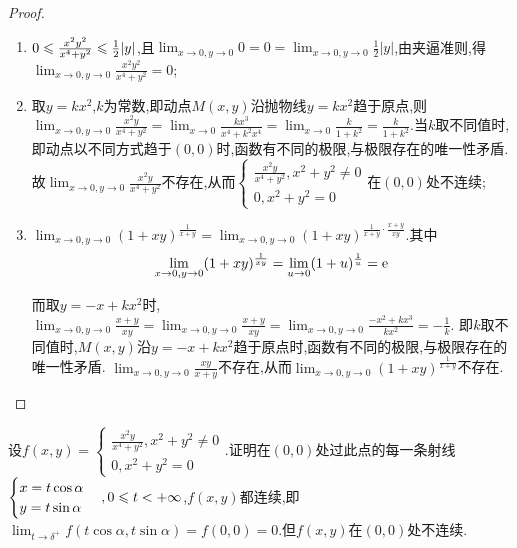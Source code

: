 \begin{proof}
    \begin{enumerate}
        \item $0 \leqslant \frac{x^2 y^2}{x^4 + y^2} \leqslant \frac12 |y|$,且$\lim_{x \to 0, y \to 0} 0 = 0 = \lim_{x \to 0, y \to 0} \frac12 |y|$,由夹逼准则,得$\lim_{x \to 0, y \to 0} \frac{x^2 y^2}{x^4 + y^2} =0$;
        \item 取$y = kx^2$,$k$为常数,即动点$M(x,y)$沿抛物线$y = kx^2$趋于原点,则$\lim_{x \to 0, y \to 0} \frac{x^2 y}{x^4 + y^2} = \lim_{x \to 0} \frac{kx^3}{x^4 + k^2 x^4} = \lim_{x \to 0} \frac{k}{1+k^2} = \frac{k}{1+k^2}$.当$k$取不同值时,即动点以不同方式趋于$(0,0)$时,函数有不同的极限,与极限存在的唯一性矛盾.
        故$\lim_{x \to 0, y \to 0} \frac{x^2 y}{x^4 + y^2} $不存在,从而$\begin{cases}
            \frac{x^2 y}{x^4 + y^2} ,  x^2 + y^2 \neq 0\\
            0, x^2 + y^2 = 0
        \end{cases}$在$(0,0)$处不连续;
        \item $\lim_{x \to 0, y \to 0} \left( 1 +xy \right)^{\frac{1}{x+y}} = \lim_{x \to 0, y \to 0} \left( 1 +xy \right)^{\frac{1}{x+y} \cdot \frac{x+y}{xy}} $.其中
        $$
        \lim_{x \to 0, y \to 0} (1+xy)^{\frac{1}{xy}} = \lim_{u \to 0} (1+u)^{\frac{1}{u}} = \mathrm{e}
        $$ 

        而取$y = -x + kx^2$时,$\lim_{x \to 0, y \to 0} \frac{x+y}{xy} = \lim_{x \to 0, y \to 0} \frac{x+y}{xy} = \lim_{x \to 0, y \to 0} \frac{-x^2 + kx^3}{kx^2} = -\frac{1}{k}$.
        即$k$取不同值时,$M(x,y)$沿$y = -x + kx^2$趋于原点时,函数有不同的极限,与极限存在的唯一性矛盾.
        $\lim_{x \to 0 ,y \to 0} \frac{xy}{x+y} $不存在,从而$\lim_{x \to 0, y \to 0} \left( 1 +xy \right)^{\frac{1}{x+y}} $不存在.
    \end{enumerate}
\end{proof}

\begin{example}
    设$f(x,y) = \begin{cases}
        \frac{x^2 y}{x^4 + y^2}, x^2 + y^2 \neq 0\\
        0, x^2 + y^2 = 0
    \end{cases}$.证明在$(0,0)$处过此点的每一条射线$\begin{cases}
        x = t \cos \alpha \\
        y = t \sin \alpha
    \end{cases}, 0 \leqslant t < + \infty$,$f(x,y)$都连续,即$\lim_{t \to \delta^+} f(t \cos \alpha, t \sin \alpha) = f(0,0) = 0$.但$f(x,y)$在$(0,0)$处不连续.
\end{example}

